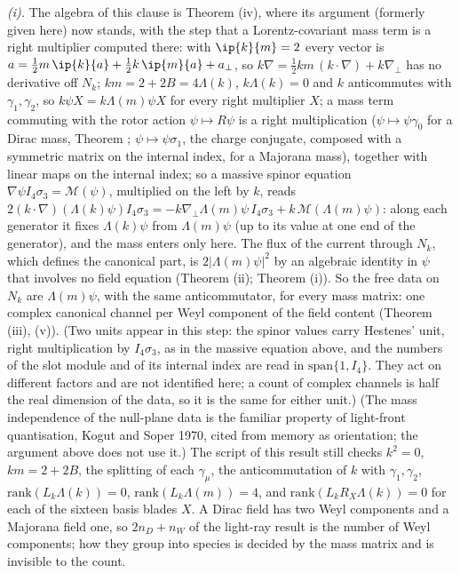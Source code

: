 \emph{(i).} The algebra of this clause is Theorem (iv), where its argument (formerly given here) now stands, with the step that a Lorentz-covariant mass term is a right multiplier computed there: with $\ip{k}{m} = 2$ every vector is $a = \tfrac12 m\,\ip{k}{a} + \tfrac12 k\,\ip{m}{a} + a_{\perp}$, so $k\nabla = \tfrac12 km\,(k\cdot\nabla) + k\nabla_{\perp}$ has no derivative off $N_{k}$; $km = 2 + 2B = 4\Lambda(k)$, $k\Lambda(k) = 0$ and $k$ anticommutes with $\gamma_{1}, \gamma_{2}$, so $k\psi X = k\Lambda(m)\psi X$ for every right multiplier $X$; a mass term commuting with the rotor action $\psi \mapsto R\psi$ is a right multiplication ($\psi \mapsto \psi\gamma_{0}$ for a Dirac mass, Theorem ; $\psi \mapsto \psi\sigma_{1}$, the charge conjugate, composed with a symmetric matrix on the internal index, for a Majorana mass), together with linear maps on the internal index; so a massive spinor equation $\nabla\psi I_{4}\sigma_{3} = \mathcal{M}(\psi)$, multiplied on the left by $k$, reads $2(k\cdot\nabla)(\Lambda(k)\psi)I_{4}\sigma_{3} = -k\nabla_{\perp}\Lambda(m)\psi\,I_{4}\sigma_{3} + k\,\mathcal{M}(\Lambda(m)\psi)$: along each generator it fixes $\Lambda(k)\psi$ from $\Lambda(m)\psi$ (up to its value at one end of the generator), and the mass enters only here. The flux of the current through $N_{k}$, which defines the canonical part, is $2|\Lambda(m)\psi|^{2}$ by an algebraic identity in $\psi$ that involves no field equation (Theorem (ii); Theorem (i)). So the free data on $N_{k}$ are $\Lambda(m)\psi$, with the same anticommutator, for every mass matrix: one complex canonical channel per Weyl component of the field content (Theorem (iii), (v)). (Two units appear in this step: the spinor values carry Hestenes' unit, right multiplication by $I_{4}\sigma_{3}$, as in the massive equation above, and the numbers of the slot module and of its internal index are read in $\mathrm{span}\{1, I_{4}\}$. They act on different factors and are not identified here; a count of complex channels is half the real dimension of the data, so it is the same for either unit.) (The mass independence of the null-plane data is the familiar property of light-front quantisation, Kogut and Soper 1970, cited from memory as orientation; the argument above does not use it.) The script of this result still checks $k^{2} = 0$, $km = 2 + 2B$, the splitting of each $\gamma_{\mu}$, the anticommutation of $k$ with $\gamma_{1}, \gamma_{2}$, $\mathrm{rank}(L_{k}\Lambda(k)) = 0$, $\mathrm{rank}(L_{k}\Lambda(m)) = 4$, and $\mathrm{rank}(L_{k}R_{X}\Lambda(k)) = 0$ for each of the sixteen basis blades $X$. A Dirac field has two Weyl components and a Majorana field one, so $2n_{D} + n_{W}$ of the light-ray result is the number of Weyl components; how they group into species is decided by the mass matrix and is invisible to the count.

